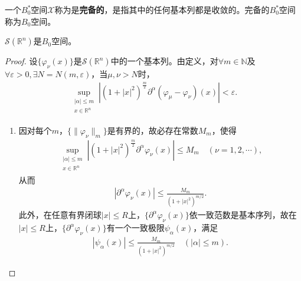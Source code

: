 \documentclass[../../main.tex]{subfiles}%
\begin{document}
\begin{definition}
一个$B_0^*$空间$\mathscr{X}$称为是\textbf{完备的}，是指其中的任何基本列都是收敛的。完备的$B_0^*$空间称为$B_0$空间。
\end{definition}

\begin{proposition}
$\mathscr{S}(\mathbb{R}^n)$是$B_0$空间。
\end{proposition}
\begin{proof}

设$\{\varphi_\nu(x)\}$是$\mathscr{S}(\mathbb{R}^n)$中的一个基本列。由定义，对$\forall m\in\mathbb{N}$及$\forall\varepsilon>0,\exists N=N(m,\varepsilon)$，当$\mu,\nu>N$时，
\begin{align}
\sup\limits_{\substack{|\alpha|\leqslant m\\x\in\mathbb{R}^n}}\left|(1+|x|^2)^{\frac{m}{2}}\partial^\alpha(\varphi_\mu-\varphi_\nu)(x)\right|<\varepsilon.\label{eq:4-2-2}
\end{align}
\begin{enumerate}[(1)]
\item 因对每个$m$，$\{\|\varphi_\nu\|_m\}$是有界的，故必存在常数$M_m$，使得
\begin{align*}
\sup\limits_{\substack{|\alpha|\leqslant m\\x\in\mathbb{R}^n}}\left|(1+|x|^2)^{\frac{m}{2}}\partial^\alpha\varphi_\nu(x)\right|\leqslant M_m\quad(\nu=1,2,\cdots),
\end{align*}
从而
\begin{align}
|\partial^\alpha\varphi_\nu(x)|\leqslant\frac{M_m}{(1+|x|^2)^{m/2}}.\label{eq:4-2-3}
\end{align}
此外，在任意有界闭球$|x|\leqslant R$上，$\{\partial^\alpha\varphi_\nu(x)\}$依一致范数是基本序列，故在$|x|\leqslant R$上，$\{\partial^\alpha\varphi_\nu(x)\}$有一个一致极限$\psi_\alpha(x)$，满足
\begin{align}
|\psi_\alpha(x)|\leqslant\frac{M_m}{(1+|x|^2)^{m/2}}\quad(|\alpha|\leqslant m).\label{eq:4-2-4}
\end{align}


\end{enumerate}
\end{proof}
\end{document}
